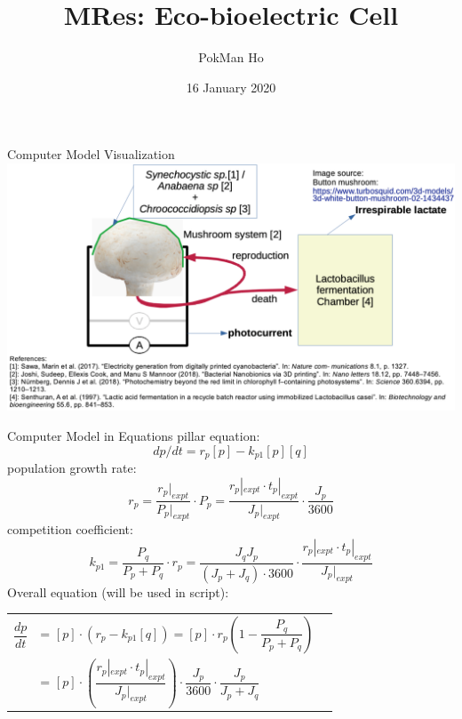 \documentclass[xcolor=x11names,compress]{beamer}
\title{MRes: Eco-bioelectric Cell}
\author{PokMan Ho}
\date{16 January 2020}
\begin{document}
\begin{frame}
    \maketitle
\end{frame}

\begin{frame}{Computer Model Visualization}
    \includegraphics[width=\linewidth]{figure/proposed_model.png}
\end{frame}

\begin{frame}{Computer Model in Equations}
    pillar equation:
    \begin{equation}\label{eq:main}
        dp/dt = r_p [p] - k_{p1} [p][q]
    \end{equation}
    population growth rate:
    \begin{equation}\label{eq:growth}
        r_p = \dfrac{r_p|_{expt}}{P_p|_{expt}}\cdot P_p = \dfrac{r_p|_{expt}\cdot t_p|_{expt}}{J_p|_{expt}}\cdot\dfrac{J_p}{3600}
    \end{equation}
    competition coefficient:
    \begin{equation}\label{eq:compete}
        k_{p1} = \dfrac{P_q}{P_p + P_q}\cdot r_p = \dfrac{J_q J_p}{(J_p + J_q)\cdot3600}\cdot \dfrac{r_p|_{expt}\cdot t_p|_{expt}}{J_p|_{expt}}
    \end{equation}
    Overall equation (will be used in script):
    \begin{tabular}{rll}
        $\dfrac{dp}{dt}$ & = $[p]\cdot(r_p - k_{p1}[q]) = [p]\cdot r_p(1-\dfrac{P_q}{P_p + P_q})$\\
         & = $[p]\cdot(\dfrac{r_p|_{expt}\cdot t_p|_{expt}}{J_p|_{expt}})\cdot\dfrac{J_p}{3600}\cdot\dfrac{J_p}{J_p + J_q}$
    \end{tabular}
\end{frame}
\end{document}
